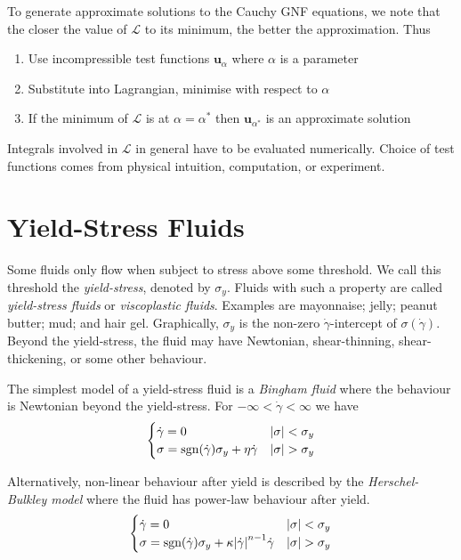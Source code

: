 \documentclass{jknotes}
\newcommand{\srate}{\dot{\gamma}}
\begin{document}
To generate approximate solutions to the Cauchy GNF equations, we note that
the closer the value of $\mathcal{L}$ to its minimum, the better the
approximation. Thus
\begin{enumerate}
	\item Use incompressible test functions $\bm{u}_\alpha$ where $\alpha$ is
		a parameter
	\item Substitute into Lagrangian, minimise with respect to $\alpha$
	\item If the minimum of $\mathcal{L}$ is at $\alpha = \alpha^*$ then
		$\bm{u}_{\alpha^*}$ is an approximate solution
\end{enumerate}

Integrals involved in $\mathcal{L}$ in general have to be evaluated
numerically. Choice of test functions comes from physical intuition,
computation, or experiment.

\section{Yield-Stress Fluids}
Some fluids only flow when subject to stress above some threshold. We call
this threshold the \emph{yield-stress}, denoted by $\sigma_y$. Fluids with such
a property are called \emph{yield-stress fluids} or \emph{viscoplastic fluids}.
Examples are mayonnaise; jelly; peanut butter; mud; and hair gel. Graphically,
$\sigma_y$ is the non-zero $\srate$-intercept of $\sigma(\srate)$. Beyond the
yield-stress, the fluid may have Newtonian, shear-thinning, shear-thickening,
or some other behaviour. 

The simplest model of a yield-stress fluid is a \emph{Bingham fluid} where the
behaviour is Newtonian beyond the yield-stress. For $-\infty < \srate <
\infty$ we have
\begin{equation}
	\begin{cases}
		\srate = 0 & \abs{\sigma} < \sigma_y \\
		\sigma = \text{sgn}(\srate)\sigma_y + \eta \srate & \abs{\sigma} > \sigma_y
	\end{cases}
\end{equation}

Alternatively, non-linear behaviour after yield is described by the
\emph{Herschel-Bulkley model} where the fluid has power-law behaviour after
yield. 
\begin{equation}
	\begin{cases}
		\srate = 0 & \abs{\sigma} < \sigma_y \\
		\sigma = \text{sgn}(\srate)\sigma_y + \kappa \abs{\srate}^{n-1} \srate
		& \abs{\sigma} > \sigma_y 
	\end{cases}
\end{equation}
\end{document}
